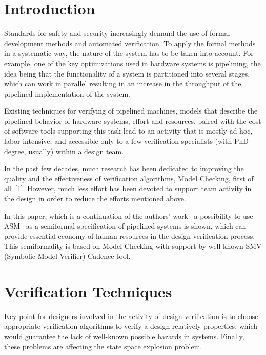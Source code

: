       \begin{multicols}{2}

      \label{st\stat}


\section{Introduction}

\noindent
Standards for safety and security increasingly demand the use of formal development 
methods and automated verification. To apply the formal methods in a systematic way, the nature 
of the system has to be taken into account. For example, one of the key optimizations used in 
hardware systems is pipelining, the idea being that the functionality of a system is partitioned into 
several stages, which can work in parallel resulting in an increase in the throughput of the 
pipelined implementation of the system.  
       
       Existing techniques for verifying of pipelined machines, models that describe the 
pipelined behavior of hardware systems, effort and resources, paired with the cost of software 
tools supporting this task lead to an activity that is mostly ad-hoc, labor intensive, and accessible 
only to a few verification specialists (with PhD degree, usually) within a design team. 
       
In the past few decades, much research has been dedicated to improving the quality and the 
effectiveness of verification algorithms, Model Checking, first of all~[1]. However, much less 
effort has been devoted to support team activity in the design in order to reduce the efforts 
mentioned above.  
       
       In this paper, which is a continuation of the authors' work~\cite{11fr} a possibility 
to use ASM~\cite{4fr} as a semiformal specification of pipelined 
systems is shown, which can provide essential economy of human resources in the design verification 
process. This semiformality is based on Model Checking with support by well-known SMV 
(Symbolic Model Verifier) Cadence tool.       
 
\section{Verification Techniques}
       
\noindent
Key point for designers involved in the activity of design verification is to choose   
appropriate verification algorithms to verify a design relatively properties, which would guarantee 
the lack of well-known possible hazards in systems. Finally, these problems are affecting the state 
space explosion problem.  
       

\end{multicols}
